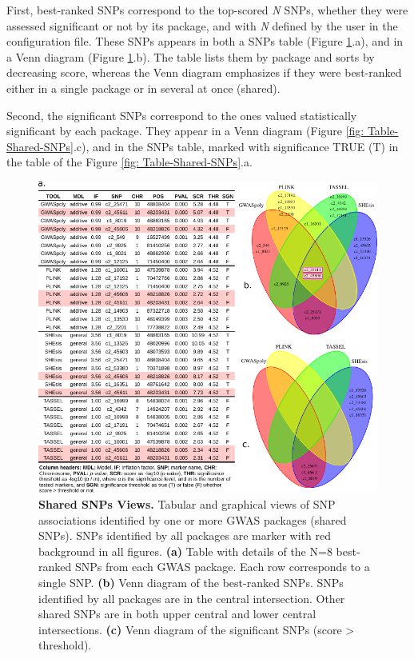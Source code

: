 \documentclass{article}
\begin{document}
First, best-ranked SNPs correspond to the top-scored \emph{N} SNPs, whether they were assessed significant or not by its package, and with\emph{ N} defined by the user in the configuration file. These SNPs appears in both a SNPs table (Figure \ref{fig:Table-Shared-SNPs}.a), and in a Venn diagram (Figure \ref{fig:Table-Shared-SNPs}.b). The table lists them by package and sorts by decreasing score, whereas the Venn diagram emphasizes if they were best-ranked either in a single package or in several at once (shared).

Second, the significant SNPs correspond to the ones valued statistically significant by each package. They appear in a Venn diagram (Figure \ref{fig: Table-Shared-SNPs}.c), and in the SNPs table, marked with significance TRUE (T) in the table of the Figure \ref{fig: Table-Shared-SNPs}.a.

\begin{figure}[H]
\begin{centering}
\includegraphics{images/paper-table-venn-best} 
\par\end{centering}
\caption{\textbf{Shared SNPs Views.} Tabular and graphical views of SNP associations identified by one or more GWAS packages (shared SNPs). SNPs identified by all packages are marker with red background in all figures. \textbf{(a)} Table with details of the N=8 best-ranked SNPs from each GWAS package. Each row corresponds to a single SNP. \textbf{(b)} Venn diagram of the best-ranked SNPs. SNPs identified by all packages are in the central intersection. Other shared SNPs are in both upper central and lower central intersections. \textbf{(c)} Venn diagram of the significant SNPs (score \textgreater{} threshold). \label{fig:Table-Shared-SNPs}}
\end{figure}
\end{document}
